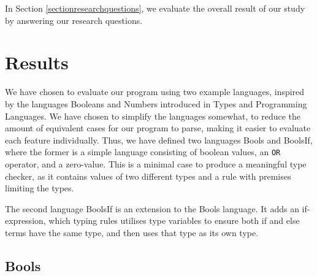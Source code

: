 \documentclass[nofilelist]{cslthse-msc}
\newcommand{\CR}[1]{\textcolor{green!60!black}{[\textbf{CR}:#1]}}
\begin{document}
In Section \ref{sectionresearchquestions}, we evaluate the overall result of our study by answering our research questions.
\section{Results} %
We have chosen to evaluate our program using two example languages, inspired by the languages Booleans and Numbers introduced in Types and Programming Languages\cite{Pierce}.
We have chosen to simplify the languages somewhat, to reduce the amount of equivalent cases for our program to parse, making it easier to evaluate each feature individually.
Thus, we have defined two languages Bools and BoolsIf, where the former is a simple language consisting of boolean values, an \lstinline{OR} operator, and a zero-value.
This is a minimal case to produce a meaningful type checker, as it contains values of two different types and a rule with premises limiting the types.

The second language BoolsIf is an extension to the Bools language.
It adds an if-expression, which typing rules utilises type variables to ensure both if and else terms have the same type, and then uses that type as its own type.
\subsection{Bools}
\end{document}
